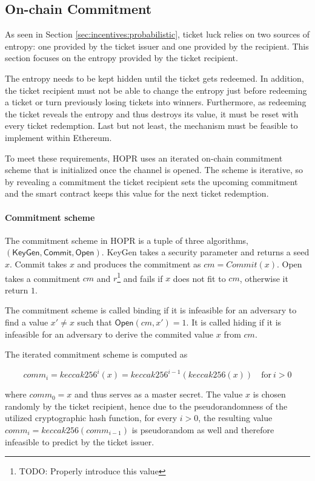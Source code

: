 \subsection{On-chain Commitment}
\label{sec:incentives:commitment}

As seen in Section \ref{sec:incentives:probabilistic}, ticket luck relies on two sources of entropy: one provided by the ticket issuer and one provided by the recipient. This section focuses on the entropy provided by the ticket recipient.

The entropy needs to be kept hidden until the ticket gets redeemed. In addition, the ticket recipient must not be able to change the entropy just before redeeming a ticket or turn previously losing tickets into winners. Furthermore, as redeeming the ticket reveals the entropy and thus destroys its value, it must be reset with every ticket redemption. Last but not least, the mechanism must be feasible to implement within Ethereum.

To meet these requirements, HOPR uses an iterated on-chain commitment scheme that is initialized once the channel is opened. The scheme is iterative, so by revealing a commitment the ticket recipient sets the upcoming commitment and the smart contract keeps this value for the next ticket redemption.

\paragraph{Commitment scheme}
\label{sec:incentives:commitment:scheme}

The commitment scheme in HOPR is a tuple of three algorithms, $(\mathsf{KeyGen}, \mathsf{Commit}, \mathsf{Open})$. \textsf{KeyGen} takes a security parameter and returns a seed $x$. \textsf{Commit} takes $x$ and produces the commitment as $ cm = Commit(x) $. \textsf{Open} takes a commitment $cm$ and $r$\footnote{TODO: Properly introduce this value} and fails if $x$ does not fit to $cm$, otherwise it return $1$.

The commitment scheme is called binding if it is infeasible for an adversary to find a value $x' \ne x$ such that $\mathsf{Open}(cm, x') = 1$. It is called hiding if it is infeasible for an adversary to derive the commited value $x$ from $cm$.

The iterated commitment scheme is computed as

$$ comm_i = keccak256 ^i (x) = keccak256 ^{i-1} (keccak256 (x)) \quad \text{for} \ i > 0$$

where $comm_0 = x$ and thus serves as a master secret. The value $x$ is chosen randomly by the ticket recipient, hence due to the pseudorandomness of the utilized cryptographic hash function, for every $i > 0$, the resulting value $comm_i = keccak256(comm_{i-1})$ is pseudorandom as well and therefore infeasible to predict by the ticket issuer.

